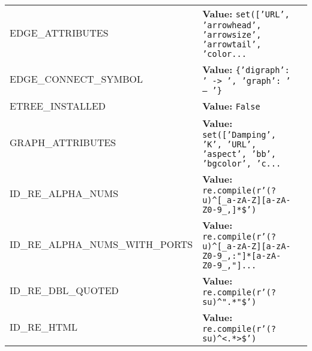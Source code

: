 \begin{longtable}{|p{\varnamewidth}|p{\vardescrwidth}|l}
\cline{1-2}
\raggedright E\-D\-G\-E\-\_\-A\-T\-T\-R\-I\-B\-U\-T\-E\-S\- & \raggedright \textbf{Value:} 
{\tt \texttt{set([}\texttt{'}\texttt{URL}\texttt{'}\texttt{, }\texttt{'}\texttt{arrowhead}\texttt{'}\texttt{, }\texttt{'}\texttt{arrowsize}\texttt{'}\texttt{, }\texttt{'}\texttt{arrowtail}\texttt{'}\texttt{, }\texttt{'}\texttt{color}\texttt{...}}&\\
\cline{1-2}
\raggedright E\-D\-G\-E\-\_\-C\-O\-N\-N\-E\-C\-T\-\_\-S\-Y\-M\-B\-O\-L\- & \raggedright \textbf{Value:} 
{\tt \texttt{\{}\texttt{'}\texttt{digraph}\texttt{'}\texttt{: }\texttt{'}\texttt{ -{\textgreater} }\texttt{'}\texttt{, }\texttt{'}\texttt{graph}\texttt{'}\texttt{: }\texttt{'}\texttt{ -- }\texttt{'}\texttt{\}}}&\\
\cline{1-2}
\raggedright E\-T\-R\-E\-E\-\_\-I\-N\-S\-T\-A\-L\-L\-E\-D\- & \raggedright \textbf{Value:} 
{\tt False}&\\
\cline{1-2}
\raggedright G\-R\-A\-P\-H\-\_\-A\-T\-T\-R\-I\-B\-U\-T\-E\-S\- & \raggedright \textbf{Value:} 
{\tt \texttt{set([}\texttt{'}\texttt{Damping}\texttt{'}\texttt{, }\texttt{'}\texttt{K}\texttt{'}\texttt{, }\texttt{'}\texttt{URL}\texttt{'}\texttt{, }\texttt{'}\texttt{aspect}\texttt{'}\texttt{, }\texttt{'}\texttt{bb}\texttt{'}\texttt{, }\texttt{'}\texttt{bgcolor}\texttt{'}\texttt{, }\texttt{'}\texttt{c}\texttt{...}}&\\
\cline{1-2}
\raggedright I\-D\-\_\-R\-E\-\_\-A\-L\-P\-H\-A\-\_\-N\-U\-M\-S\- & \raggedright \textbf{Value:} 
{\tt re.compile(r'\texttt{(?u)}{\textasciicircum}\texttt{[}\_a\texttt{-}zA\texttt{-}Z\texttt{]}\texttt{[}a\texttt{-}zA\texttt{-}Z0\texttt{-}9\_,\texttt{]}\texttt{*}\$')}&\\
\cline{1-2}
\raggedright I\-D\-\_\-R\-E\-\_\-A\-L\-P\-H\-A\-\_\-N\-U\-M\-S\-\_\-W\-I\-T\-H\-\_\-P\-O\-R\-T\-S\- & \raggedright \textbf{Value:} 
{\tt re.compile(r'\texttt{(?u)}{\textasciicircum}\texttt{[}\_a\texttt{-}zA\texttt{-}Z\texttt{]}\texttt{[}a\texttt{-}zA\texttt{-}Z0\texttt{-}9\_,:"\texttt{]}\texttt{*}\texttt{[}a\texttt{-}zA\texttt{-}Z0\texttt{-}9\_,"\texttt{]}\texttt{...}}&\\
\cline{1-2}
\raggedright I\-D\-\_\-R\-E\-\_\-D\-B\-L\-\_\-Q\-U\-O\-T\-E\-D\- & \raggedright \textbf{Value:} 
{\tt re.compile(r'\texttt{(?su)}{\textasciicircum}".\texttt{*}"\$')}&\\
\cline{1-2}
\raggedright I\-D\-\_\-R\-E\-\_\-H\-T\-M\-L\- & \raggedright \textbf{Value:} 
{\tt re.compile(r'\texttt{(?su)}{\textasciicircum}{\textless}.\texttt{*}{\textgreater}\$')}&\\
\cline{1-2}

\end{longtable}
